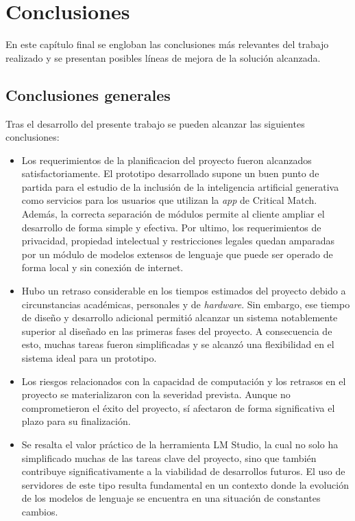 
\chapter{Conclusiones} %
En este capítulo final se engloban las conclusiones más relevantes del trabajo realizado
y se presentan posibles líneas de mejora de la solución alcanzada.


\section{Conclusiones generales}

Tras el desarrollo del presente trabajo se pueden alcanzar las siguientes conclusiones:

\begin{itemize}
\item Los requerimientos de la planificacion del proyecto fueron alcanzados
      satisfactoriamente.
      El prototipo desarrollado supone un buen punto de partida para el estudio de
      la inclusión de la inteligencia artificial generativa como servicios para
      los usuarios que utilizan la \textit{app} de Critical Match.
      Además, la correcta separación de módulos permite al cliente ampliar el desarrollo
      de forma simple y efectiva.
      Por ultimo, los requerimientos de privacidad, propiedad intelectual y restricciones legales
      quedan amparadas por un módulo de modelos extensos de lenguaje que puede ser operado
      de forma local y sin conexión de internet.     
\item Hubo un retraso considerable en los tiempos estimados del proyecto debido a
      circunstancias académicas, personales y de \textit{hardware}.
      Sin embargo, ese tiempo de diseño y desarrollo adicional permitió alcanzar un sistema
      notablemente superior al diseñado en las primeras fases del proyecto. 
      A consecuencia de esto, muchas tareas fueron simplificadas y se alcanzó una flexibilidad
      en el sistema ideal para un prototipo.
\item Los riesgos relacionados con la capacidad de computación y los retrasos en el proyecto
      se materializaron con la severidad prevista.
      Aunque no comprometieron el éxito del proyecto,
      sí afectaron de forma significativa el plazo para su finalización.
\item Se resalta el valor práctico de la herramienta LM Studio,
      la cual no solo ha simplificado muchas de las tareas clave del proyecto,
      sino que también contribuye significativamente a la viabilidad de desarrollos futuros.
      El uso de servidores de este tipo resulta fundamental en un contexto donde
      la evolución de los modelos de lenguaje se encuentra en una situación de constantes cambios.
\end{itemize}
